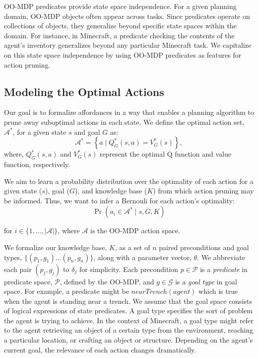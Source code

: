 \documentclass[letterpaper]{article}
\begin{document}
OO-MDP predicates provide state space independence. For a given planning domain, OO-MDP objects
often appear across tasks. Since predicates operate on collections
of objects, they generalize beyond specific state spaces within the domain.
For instance, in Minecraft, a predicate checking the contents of the agent's inventory
generalizes beyond any particular Minecraft task. We capitalize on this state space
independence by using OO-MDP predicates as features for action pruning.

\subsection{Modeling the Optimal Actions}


Our goal is to formalize affordances in a way that enables a planning
algorithm to prune away suboptimal actions in each state. We define
the optimal action set, $\mathcal{A}^*$, for a given state $s$ and
goal $G$ as:
\begin{equation}
\mathcal{A}^* = \left\{ a \mid Q^*_G(s,a) = V^*_G(s) \right\}, 
\label{eq:opt_act_set}
\end{equation}
where, $Q^*_G(s,a)$ and $V^*_G(s)$ represent the optimal Q function and 
value function, respectively.

We aim to learn a probability distribution over the optimality of each action
for a given state ($s$), goal ($G$), and knowledge base ($K$) from
which action pruning may be informed. Thus, we want to infer a Bernouli
for each action's optimality:
\begin{equation}
\Pr(a_i \in \mathcal{A}^* \mid s, G, K)
\label{eq:master}
\end{equation}

\noindent for $i \in \{1, \ldots, |\mathcal{A}|\}$, where $\mathcal{A}$ is the OO-MDP action space.

We formalize our knowledge base, $K$, as a set of $n$ paired
preconditions and goal types, $\{ (p_1, g_1) \ldots (p_{n}, g_{n})\}$,
along with a parameter vector, $\theta$. We abbreviate each pair
$(p_j, g_j)$ to $\delta_j$ for simplicity. Each precondition $p \in
\mathcal{P}$ is a {\it predicate} in predicate space, $\mathcal{P}$,
defined by the OO-MDP, and $g \in \mathcal{G}$ is a {\it goal type} in
goal space.  For example, a predicate might be $nearTrench(agent)$
which is true when the agent is standing near a trench. We assume
that the goal space consists of logical expressions of state
predicates. A goal type specifies the sort of problem the agent is
trying to achieve. In the context of Minecraft, a goal type might
refer to the agent retrieving an object of a certain type from the
environment, reaching a particular location, or crafting an object or structure.
Depending on the agent's current goal, the relevance of each action changes
dramatically.
\end{document}
